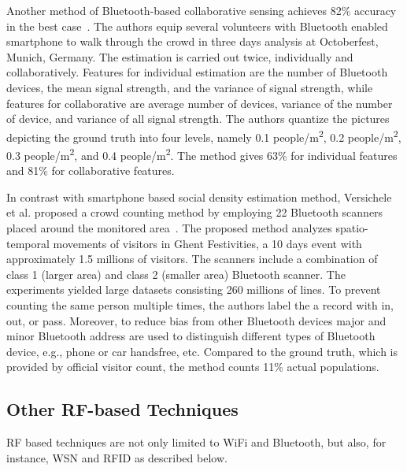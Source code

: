 	Another method of Bluetooth-based collaborative sensing achieves 82\% accuracy in the best case~\cite{thesis041}. The authors equip several volunteers with Bluetooth enabled smartphone to walk through the crowd in three days analysis at Octoberfest, Munich, Germany. The estimation is carried out twice, individually and collaboratively. Features for individual estimation are the number of Bluetooth devices, the mean signal strength, and the variance of signal strength, while features for collaborative are average number of devices, variance of the number of device, and variance of all signal strength. The authors quantize the pictures depicting the ground truth into four levels, namely 0.1 people/m\textsuperscript{2}, 0.2 people/m\textsuperscript{2}, 0.3 people/m\textsuperscript{2}, and 0.4 people/m\textsuperscript{2}. The method gives 63\% for individual features and 81\% for collaborative features.

	In contrast with smartphone based social density estimation method, Versichele et al. proposed a crowd counting method by employing 22 Bluetooth scanners placed around the monitored area~\cite{thesis016}. The proposed method analyzes spatio-temporal movements of visitors in Ghent Festivities, a 10 days event with approximately 1.5 millions of visitors. The scanners include a combination of class 1 (larger area) and class 2 (smaller area) Bluetooth scanner. The experiments yielded large datasets consisting 260 millions of lines. To prevent counting the same person multiple times, the authors label the a record with in, out, or pass. Moreover, to reduce bias from other Bluetooth devices major and minor Bluetooth address are used to distinguish different types of Bluetooth device, e.g., phone or car handsfree, etc. Compared to the ground truth, which is provided by official visitor count, the method counts 11\% actual populations.

	

	








	\subsection{Other RF-based Techniques} %
	\label{sub:other_rf_techniques}
	\ac{RF} based techniques are not only limited to WiFi and Bluetooth, but also, for instance, \ac{WSN} and \ac{RFID} as described below.

